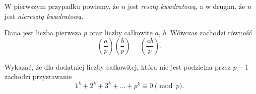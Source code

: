 \noindent
W pierwszym przypadku powiemy, że $n$ jest \textit{resztą kwadratową}, a w drugim, że $n$ jest \textit{nieresztą kwadratową}.



\noindent
Dana jest liczba pierwsza $p$ oraz liczby całkowite $a$, $b$. Wówczas zachodzi równość
\[
	\left(\frac{a}{p}\right)\left(\frac{b}{p}\right) = \left(\frac{ab}{p}\right).
\]




\vspace{10px}


\vspace{10px}


\noindent
Wykazać, że dla dodatniej liczby całkowitej, która nie jest podzielna przez $p - 1$ zachodzi przystawanie
\[
	1^k + 2^k + 3^k + ... + p^k \equiv 0 \pmod{p}.
\]

